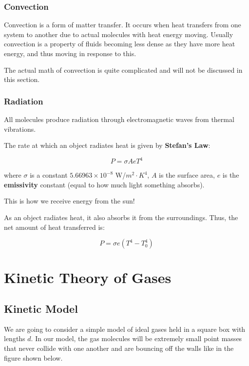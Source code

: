 \documentclass{report}
\begin{document}
\subsection{Convection}

Convection is a form of matter transfer. It occurs when heat transfers from one system to another due to actual molecules with heat energy moving. Usually convection is a property of fluids becoming less dense as they have more heat energy, and thus moving in response to this.

The actual math of convection is quite complicated and will not be discussed in this section.

\subsection{Radiation}

All molecules produce radiation through electromagnetic waves from thermal vibrations. 

The rate at which an object radiates heat is given by \textbf{Stefan's Law}:

$$\boxed{P = \sigma AeT^4}$$

where $\sigma$ is a constant  $5.66963 \times 10^{-8}$ W/$m^2 \cdot K^4$, $A$ is the surface area, $e$ is the \textbf{emissivity} constant (equal to how much light something absorbs).

This is how we receive energy from the sun!

As an object radiates heat, it also absorbs it from the surroundings. Thus, the net amount of heat transferred is:

$$P = \sigma e(T^4-T_0^4)$$




\chapter{Kinetic Theory of Gases}
\section{Kinetic Model}

We are going to consider a simple model of ideal gases held in a square box with lengths $d$. In our model, the gas molecules will be extremely small point masses that never collide with one another and are bouncing off the walls like in the figure shown below.
\end{document}

